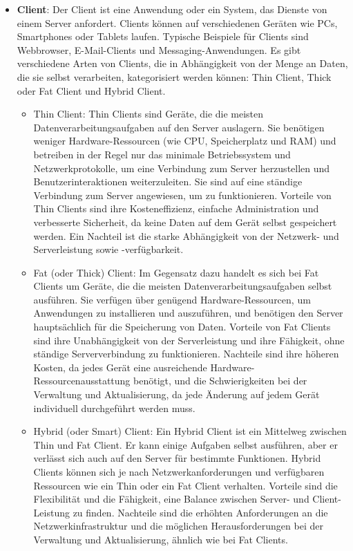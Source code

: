 \documentclass[../vs-script-first-v01.tex]{subfiles}
\begin{document}
\begin{itemize}
\item \textbf{Client}: Der Client ist eine Anwendung oder ein System, das Dienste von einem Server anfordert. Clients können auf verschiedenen Geräten wie PCs, Smartphones oder Tablets laufen. Typische Beispiele für Clients sind Webbrowser, E-Mail-Clients und Messaging-Anwendungen.
Es gibt verschiedene Arten von Clients, die in Abhängigkeit von der Menge an Daten, die sie selbst verarbeiten, kategorisiert werden können: Thin Client, Thick oder Fat Client und Hybrid Client.
\begin{itemize}
\item Thin Client: Thin Clients sind Geräte, die die meisten Datenverarbeitungsaufgaben auf den Server auslagern. Sie benötigen weniger Hardware-Ressourcen (wie CPU, Speicherplatz und RAM) und betreiben in der Regel nur das minimale Betriebssystem und Netzwerkprotokolle, um eine Verbindung zum Server herzustellen und Benutzerinteraktionen weiterzuleiten. Sie sind auf eine ständige Verbindung zum Server angewiesen, um zu funktionieren.
Vorteile von Thin Clients sind ihre Kosteneffizienz, einfache Administration und verbesserte Sicherheit, da keine Daten auf dem Gerät selbst gespeichert werden. Ein Nachteil ist die starke Abhängigkeit von der Netzwerk- und Serverleistung sowie -verfügbarkeit.
\item Fat (oder Thick) Client: Im Gegensatz dazu handelt es sich bei Fat Clients um Geräte, die die meisten Datenverarbeitungsaufgaben selbst ausführen. Sie verfügen über genügend Hardware-Ressourcen, um Anwendungen zu installieren und auszuführen, und benötigen den Server hauptsächlich für die Speicherung von Daten.
Vorteile von Fat Clients sind ihre Unabhängigkeit von der Serverleistung und ihre Fähigkeit, ohne ständige Serververbindung zu funktionieren. Nachteile sind ihre höheren Kosten, da jedes Gerät eine ausreichende Hardware-Ressourcenausstattung benötigt, und die Schwierigkeiten bei der Verwaltung und Aktualisierung, da jede Änderung auf jedem Gerät individuell durchgeführt werden muss.
\item Hybrid (oder Smart) Client: Ein Hybrid Client ist ein Mittelweg zwischen Thin und Fat Client. Er kann einige Aufgaben selbst ausführen, aber er verlässt sich auch auf den Server für bestimmte Funktionen. Hybrid Clients können sich je nach Netzwerkanforderungen und verfügbaren Ressourcen wie ein Thin oder ein Fat Client verhalten.
Vorteile sind die Flexibilität und die Fähigkeit, eine Balance zwischen Server- und Client-Leistung zu finden. Nachteile sind die erhöhten Anforderungen an die Netzwerkinfrastruktur und die möglichen Herausforderungen bei der Verwaltung und Aktualisierung, ähnlich wie bei Fat Clients.

\end{itemize}
\end{itemize}
\end{document}
